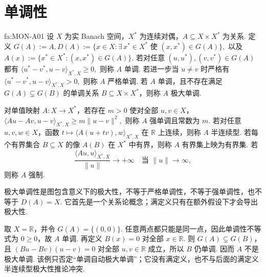 \section{单调性}\label{sec:iii05-monotonicity}

\begin{FADefinition}[A][单调性与极大单调性的规范定义]{fa:MON-A01}
设 \(\displaystyle X\) 为实 Banach 空间，\(\displaystyle X^*\) 为连续对偶，\(\displaystyle A\subseteq X\times X^*\) 为关系. 定义
\(\displaystyle G(A):=A, D(A):=\{x\in X:\exists\,x^*\in X^*\text{ 使 }(x,x^*)\in G(A)\},\)
以及
\(\displaystyle A(x):=\{x^*\in X^*:(x,x^*)\in G(A)\}.\)
若对任意 \(\displaystyle(u,u^*),(v,v^*)\in G(A)\) 都有
\(\displaystyle \langle u^*-v^*,u-v\rangle_{X^*,X}\geqslant0,\)
则称 \(\displaystyle A\) 单调. 若进一步当 \(\displaystyle u\neq v\) 时严格有
\(\displaystyle \langle u^*-v^*,u-v\rangle_{X^*,X}>0,\)
则称 \(\displaystyle A\) 严格单调. 若 \(\displaystyle A\) 单调，且不存在满足 \(\displaystyle G(A)\subsetneq G(B)\) 的单调关系 \(\displaystyle B\subseteq X\times X^*\)，则称 \(\displaystyle A\) 极大单调.

对单值映射 \(\displaystyle A:X\to X^*\)，若存在 \(\displaystyle m>0\) 使对全部 \(\displaystyle u,v\in X\)，
\(\displaystyle \langle Au-Av,u-v\rangle_{X^*,X} \geqslant m\|u-v\|^2,\)
则称 \(\displaystyle A\) 强单调且常数为 \(\displaystyle m\). 若对任意 \(\displaystyle u,v,w\in X\)，函数
\(\displaystyle t\longmapsto\langle A(u+tv),w\rangle_{X^*,X}\)
在 \(\displaystyle\mathbb R\) 上连续，则称 \(\displaystyle A\) 半连续型. 若每个有界集合 \(\displaystyle B\subseteq X\) 的像 \(\displaystyle A(B)\) 在 \(\displaystyle X^*\) 中有界，则称 \(\displaystyle A\) 有界集上映为有界集. 若
\[
\frac{\langle Au,u\rangle_{X^*,X}}{\|u\|}
\longrightarrow+\infty
\quad\text{当 }\|u\|\longrightarrow\infty,
\]
则称 \(\displaystyle A\) 强制.
\end{FADefinition}

\begin{FARemark}[极大单调性的含义]
极大单调性是图包含意义下的极大性，不等于严格单调性，不等于强单调性，也不等于 \(\displaystyle D(A)=X\). 它首先是一个关系论概念；满定义只有在额外假设下才会导出极大性.
\end{FARemark}

\begin{FACounterexample}[单调不自动极大单调]
取 \(\displaystyle X=\mathbb R\)，并令 \(\displaystyle G(A)=\{(0,0)\}\). 任意两点都只能是同一点，因此单调性不等式为 \(\displaystyle0\geqslant0\)，故 \(\displaystyle A\) 单调. 再定义 \(\displaystyle B(x)=0\) 对全部 \(\displaystyle x\in\mathbb R\). 则 \(\displaystyle G(A)\subsetneq G(B)\)，且
\(\displaystyle (Bu-Bv)(u-v)=0\)
对全部 \(\displaystyle u,v\in\mathbb R\) 成立，所以 \(\displaystyle B\) 仍单调. 因而 \(\displaystyle A\) 不是极大单调. 该例只否定“单调自动极大单调”；它没有满定义，也不与后面的满定义半连续型极大性推论冲突.
\end{FACounterexample}

